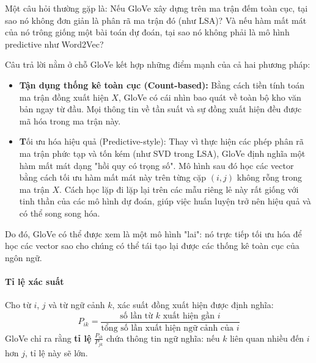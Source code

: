 \begin{tcolorbox}[
    title=GloVe: Sự giao thoa giữa Count-based và Predictive,
    colback=green!5!white, colframe=green!50!black, fonttitle=\bfseries
]
Một câu hỏi thường gặp là: Nếu GloVe xây dựng trên ma trận đếm toàn cục, tại sao nó không đơn giản là phân rã ma trận đó (như LSA)? Và nếu hàm mất mát của nó trông giống một bài toán dự đoán, tại sao nó không phải là mô hình predictive như Word2Vec?

Câu trả lời nằm ở chỗ GloVe kết hợp những điểm mạnh của cả hai phương pháp:
\begin{itemize}
    \item \textbf{Tận dụng thống kê toàn cục (Count-based):} Bằng cách tiền tính toán ma trận đồng xuất hiện $X$, GloVe có cái nhìn bao quát về toàn bộ kho văn bản ngay từ đầu. Mọi thông tin về tần suất và sự đồng xuất hiện đều được mã hóa trong ma trận này.
    \item \textbf Tối ưu hóa hiệu quả (Predictive-style): Thay vì thực hiện các phép phân rã ma trận phức tạp và tốn kém (như SVD trong LSA), GloVe định nghĩa một hàm mất mát dạng "hồi quy có trọng số". Mô hình sau đó học các vector bằng cách tối ưu hàm mất mát này trên từng cặp $(i, j)$ không rỗng trong ma trận $X$. Cách học lặp đi lặp lại trên các mẫu riêng lẻ này rất giống với tinh thần của các mô hình dự đoán, giúp việc huấn luyện trở nên hiệu quả và có thể song song hóa.
\end{itemize}
Do đó, GloVe có thể được xem là một mô hình "lai": nó trực tiếp tối ưu hóa để học các vector sao cho chúng có thể tái tạo lại được các thống kê toàn cục của ngôn ngữ.
\end{tcolorbox}

\paragraph{Tỉ lệ xác suất}
Cho từ $i$, $j$ và từ ngữ cảnh $k$, xác suất đồng xuất hiện được định nghĩa:
\[
P_{ik} = \frac{\text{số lần từ $k$ xuất hiện gần $i$}}{\text{tổng số lần xuất hiện ngữ cảnh của $i$}}
\]
GloVe chỉ ra rằng \textbf{tỉ lệ} $\frac{P_{ik}}{P_{jk}}$ chứa thông tin ngữ nghĩa: nếu $k$ liên quan nhiều đến $i$ hơn $j$, tỉ lệ này sẽ lớn.


